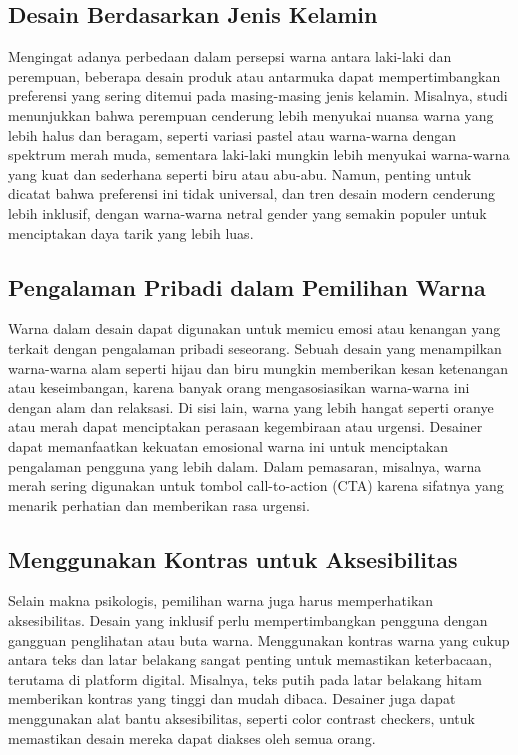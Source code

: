 \documentclass[a4paper]{article}
\begin{document}
\subsection{Desain Berdasarkan Jenis Kelamin}
Mengingat adanya perbedaan dalam persepsi warna antara laki-laki dan perempuan, beberapa desain produk atau antarmuka dapat mempertimbangkan preferensi yang sering ditemui pada masing-masing jenis kelamin. Misalnya, studi menunjukkan bahwa perempuan cenderung lebih menyukai nuansa warna yang lebih halus dan beragam, seperti variasi pastel atau warna-warna dengan spektrum merah muda, sementara laki-laki mungkin lebih menyukai warna-warna yang kuat dan sederhana seperti biru atau abu-abu. Namun, penting untuk dicatat bahwa preferensi ini tidak universal, dan tren desain modern cenderung lebih inklusif, dengan warna-warna netral gender yang semakin populer untuk menciptakan daya tarik yang lebih luas.


\subsection{Pengalaman Pribadi dalam Pemilihan Warna}
Warna dalam desain dapat digunakan untuk memicu emosi atau kenangan yang terkait dengan pengalaman pribadi seseorang. Sebuah desain yang menampilkan warna-warna alam seperti hijau dan biru mungkin memberikan kesan ketenangan atau keseimbangan, karena banyak orang mengasosiasikan warna-warna ini dengan alam dan relaksasi. Di sisi lain, warna yang lebih hangat seperti oranye atau merah dapat menciptakan perasaan kegembiraan atau urgensi. Desainer dapat memanfaatkan kekuatan emosional warna ini untuk menciptakan pengalaman pengguna yang lebih dalam. Dalam pemasaran, misalnya, warna merah sering digunakan untuk tombol call-to-action (CTA) karena sifatnya yang menarik perhatian dan memberikan rasa urgensi.


\subsection{Menggunakan Kontras untuk Aksesibilitas}
Selain makna psikologis, pemilihan warna juga harus memperhatikan aksesibilitas. Desain yang inklusif perlu mempertimbangkan pengguna dengan gangguan penglihatan atau buta warna. Menggunakan kontras warna yang cukup antara teks dan latar belakang sangat penting untuk memastikan keterbacaan, terutama di platform digital. Misalnya, teks putih pada latar belakang hitam memberikan kontras yang tinggi dan mudah dibaca. Desainer juga dapat menggunakan alat bantu aksesibilitas, seperti color contrast checkers, untuk memastikan desain mereka dapat diakses oleh semua orang.
\end{document}
